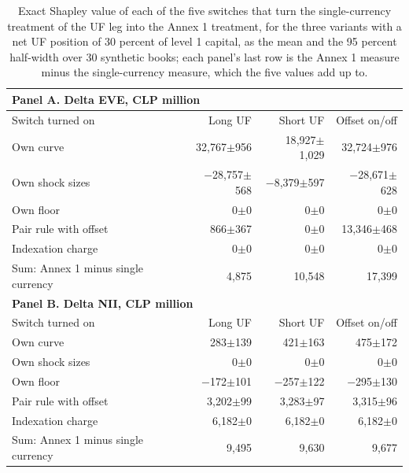 \begin{table}[htbp]
\centering
\footnotesize
\setlength{\tabcolsep}{3.5pt}
\caption{Exact Shapley value of each of the five switches that turn the single-currency treatment of the UF leg into the Annex 1 treatment, for the three variants with a net UF position of 30 percent of level 1 capital, as the mean and the 95 percent half-width over 30 synthetic books; each panel's last row is the Annex 1 measure minus the single-currency measure, which the five values add up to.}
\label{tab:shapley}
\begin{tabular}{lrrr}
\toprule
\multicolumn{4}{l}{\textbf{Panel A. Delta EVE, CLP million}} \\
\midrule
Switch turned on & Long UF & Short UF & Offset on/off \\
\midrule
Own curve & 32{,}767$\pm$956 & 18{,}927$\pm$1{,}029 & 32{,}724$\pm$976 \\
Own shock sizes & $-$28{,}757$\pm$568 & $-$8{,}379$\pm$597 & $-$28{,}671$\pm$628 \\
Own floor & 0$\pm$0 & 0$\pm$0 & 0$\pm$0 \\
Pair rule with offset & 866$\pm$367 & 0$\pm$0 & 13{,}346$\pm$468 \\
Indexation charge & 0$\pm$0 & 0$\pm$0 & 0$\pm$0 \\
Sum: Annex 1 minus single currency & 4{,}875 & 10{,}548 & 17{,}399 \\
\midrule
\multicolumn{4}{l}{\textbf{Panel B. Delta NII, CLP million}} \\
\midrule
Switch turned on & Long UF & Short UF & Offset on/off \\
\midrule
Own curve & 283$\pm$139 & 421$\pm$163 & 475$\pm$172 \\
Own shock sizes & 0$\pm$0 & 0$\pm$0 & 0$\pm$0 \\
Own floor & $-$172$\pm$101 & $-$257$\pm$122 & $-$295$\pm$130 \\
Pair rule with offset & 3{,}202$\pm$99 & 3{,}283$\pm$97 & 3{,}315$\pm$96 \\
Indexation charge & 6{,}182$\pm$0 & 6{,}182$\pm$0 & 6{,}182$\pm$0 \\
Sum: Annex 1 minus single currency & 9{,}495 & 9{,}630 & 9{,}677 \\
\bottomrule
\end{tabular}
\end{table}
